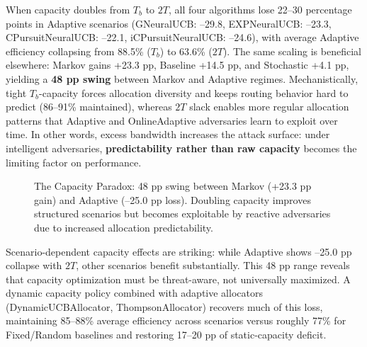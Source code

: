 \documentclass[11pt,a4paper]{article}
\begin{document}
When capacity doubles from $T_b$ to $2T$, all four algorithms lose 22--30 percentage points in Adaptive scenarios (GNeuralUCB: --29.8, EXPNeuralUCB: --23.3, CPursuitNeuralUCB: --22.1, iCPursuitNeuralUCB: --24.6), with average Adaptive efficiency collapsing from 88.5\% ($T_b$) to 63.6\% ($2T$). The same scaling is beneficial elsewhere: Markov gains +23.3 pp, Baseline +14.5 pp, and Stochastic +4.1 pp, yielding a \textbf{48 pp swing} between Markov and Adaptive regimes. Mechanistically, tight $T_b$-capacity forces allocation diversity and keeps routing behavior hard to predict (86--91\% maintained), whereas $2T$ slack enables more regular allocation patterns that Adaptive and OnlineAdaptive adversaries learn to exploit over time. In other words, excess bandwidth increases the attack surface: under intelligent adversaries, \textbf{predictability rather than raw capacity} becomes the limiting factor on performance.

\begin{figure}[tb]
\centering
{}
\caption{The Capacity Paradox: 48 pp swing between Markov (+23.3 pp gain) and Adaptive (--25.0 pp loss). Doubling capacity improves structured scenarios but becomes exploitable by reactive adversaries due to increased allocation predictability.}
\label{fig:capacity_paradox}
\end{figure}

Scenario-dependent capacity effects are striking: while Adaptive shows --25.0 pp collapse with $2T$, other scenarios benefit substantially. This 48 pp range reveals that capacity optimization must be threat-aware, not universally maximized. A dynamic capacity policy combined with adaptive allocators (DynamicUCBAllocator, ThompsonAllocator) recovers much of this loss, maintaining 85--88\% average efficiency across scenarios versus roughly 77\% for Fixed/Random baselines and restoring 17--20 pp of static-capacity deficit.
\end{document}
